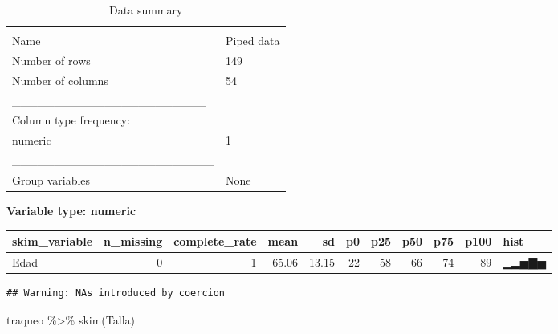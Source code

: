 \documentclass[
]{article}
\newenvironment{Shaded}{\begin{snugshade}}{\end{snugshade}}
\newcommand{\DocumentationTok}[1]{\textcolor[rgb]{0.56,0.35,0.01}{\textbf{\textit{#1}}}}
\newcommand{\FunctionTok}[1]{\textcolor[rgb]{0.00,0.00,0.00}{#1}}
\newcommand{\NormalTok}[1]{#1}
\newcommand{\OtherTok}[1]{\textcolor[rgb]{0.56,0.35,0.01}{#1}}
\newcommand{\SpecialCharTok}[1]{\textcolor[rgb]{0.00,0.00,0.00}{#1}}
\begin{document}
\begin{longtable}[]{@{}ll@{}}
\caption{Data summary}\tabularnewline
\toprule
& \\
\midrule
\endfirsthead
\toprule
& \\
\midrule
\endhead
Name & Piped data \\
Number of rows & 149 \\
Number of columns & 54 \\
\_\_\_\_\_\_\_\_\_\_\_\_\_\_\_\_\_\_\_\_\_\_\_ & \\
Column type frequency: & \\
numeric & 1 \\
\_\_\_\_\_\_\_\_\_\_\_\_\_\_\_\_\_\_\_\_\_\_\_\_ & \\
Group variables & None \\
\bottomrule
\end{longtable}

\textbf{Variable type: numeric}

\begin{longtable}[]{@{}lrrrrrrrrrl@{}}
\toprule
skim\_variable & n\_missing & complete\_rate & mean & sd & p0 & p25 &
p50 & p75 & p100 & hist \\
\midrule
\endhead
Edad & 0 & 1 & 65.06 & 13.15 & 22 & 58 & 66 & 74 & 89 & ▁▂▅▇▅ \\
\bottomrule
\end{longtable}

\begin{Shaded}
\end{Shaded}

\begin{verbatim}
## Warning: NAs introduced by coercion
\end{verbatim}

\begin{Shaded}
\begin{Highlighting}[]
\NormalTok{traqueo }\SpecialCharTok{\%\textgreater{}\%}
  \FunctionTok{skim}\NormalTok{(Talla)}
\end{Highlighting}
\end{Shaded}
\end{document}
